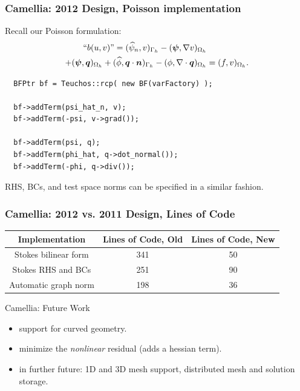 \documentclass[mathserif]{beamer}
\newcommand{\vect}[1]{\ensuremath\boldsymbol{#1}}
\begin{document}
\begin{frame}[fragile]
\frametitle{Camellia: 2012 Design, Poisson implementation}
Recall our Poisson formulation:
\begin{align*}
\text{``}b(u,v)\text{''} = (\widehat{\psi}_n,v)_{\Gamma_h} - (\vect{\psi}, \nabla v)_{\Omega_h} &\\
+ (\vect{\psi}, \vect{q})_{\Omega_h} + (\widehat{\phi}, \vect{q}  \cdot \vect{n})_{\Gamma_h} - (\phi, \nabla \cdot \vect{q})_{\Omega_h} &= (f,v)_{\Omega_h}.
\end{align*}
\begin{lstlisting}
  BFPtr bf = Teuchos::rcp( new BF(varFactory) );
  
  bf->addTerm(psi_hat_n, v);
  bf->addTerm(-psi, v->grad());
  
  bf->addTerm(psi, q);
  bf->addTerm(phi_hat, q->dot_normal());
  bf->addTerm(-phi, q->div());
\end{lstlisting}

RHS, BCs, and test space norms can be specified in a similar fashion.

\end{frame}

\begin{frame}
\frametitle{Camellia: 2012 vs. 2011 Design, Lines of Code}

\begin{table}[h!b!p!]
\begin{center}
\begin{tabular}{| c | c | c |}
\hline
Implementation & Lines of Code, Old & Lines of Code, New\\
\hline
Stokes bilinear form & 341 & 50 \\
Stokes RHS and BCs & 251 & 90\\
Automatic graph norm & 198 & 36 \\
\hline
\end{tabular}
\end{center}
\end{table}

\begin{block}{Camellia: Future Work}
\begin{itemize}
\item support for curved geometry.
\item minimize the \emph{nonlinear} residual (adds a hessian term).
\item in further future: 1D and 3D mesh support, distributed mesh and solution storage.
\end{itemize}
\end{block}
\end{frame}
\end{document}
